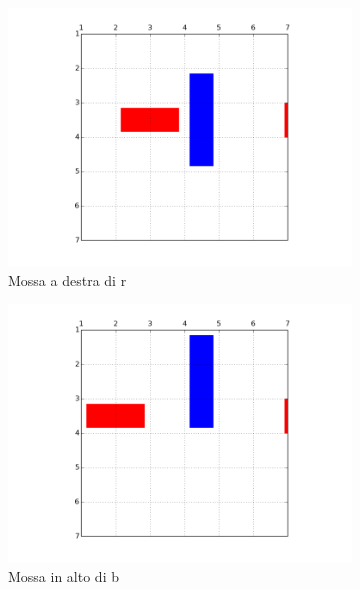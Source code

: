 \documentclass[10pt, a4paper, oneside]{article}
\begin{document}
\begin{figure}[H]
     \centering
     \begin{subfigure}[b]{0.3\textwidth}
         \centering
         \includegraphics[width=\textwidth]{images/r_right.png}
         \caption{Mossa a destra di r}
     \end{subfigure}
     \hfill
     \begin{subfigure}[b]{0.3\textwidth}
         \centering
         \includegraphics[width=\textwidth]{images/b_up.png}
         \caption{Mossa in alto di b}
     \end{subfigure}
     \hfill
     \begin{subfigure}[b]{0.3\textwidth}
         \centering

\end{subfigure}
\end{figure}
\end{document}
